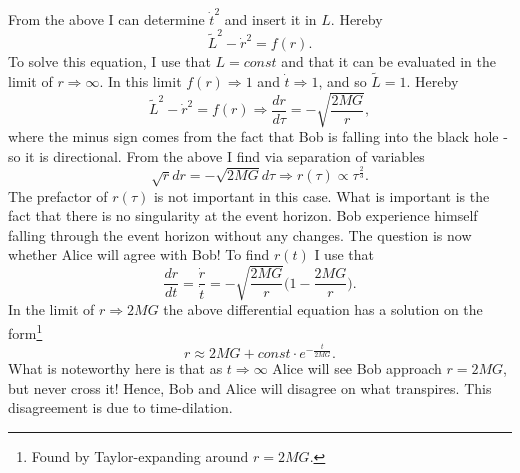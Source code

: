 \begin{example}
\begin{equation}
	\end{equation} 
	From the above I can determine $\dot{t}^2$ and insert it in $L$. Hereby
	\begin{equation}
		\tilde{L}^2-\dot{r}^2=f(r).
	\end{equation} 
	To solve this equation, I use that $L=const$ and that it can be evaluated in the limit of $r\Rightarrow\infty$. In this limit $f(r)\Rightarrow 1$ and $\dot{t}\Rightarrow1$, and so $\tilde{L}=1$. Hereby
	\begin{equation}
		\tilde{L}^2-\dot{r}^2=f(r)\Rightarrow \frac{dr}{d\tau}=-\sqrt{\frac{2MG}{r}},
	\end{equation} 
	where the minus sign comes from the fact that Bob is falling into the black hole - so it is directional. From the above I find via separation of variables
	\begin{equation}
		\sqrt{r}dr=-\sqrt{2MG}d\tau\Rightarrow r(\tau)\propto \tau^{\frac{2}{3}}.
	\end{equation} 
	The prefactor of $r(\tau)$ is not important in this case. What is important is the fact that there is no singularity at the event horizon. Bob experience himself falling through the event horizon without any changes. The question is now whether Alice will agree with Bob! To find $r(t)$ I use that
	\begin{equation}
		\frac{dr}{dt}=\frac{\dot{r}}{\dot{t}}=-\sqrt{\frac{2MG}{r}}\bigg(1-\frac{2MG}{r}\bigg).
	\end{equation} 
	In the limit of $r\Rightarrow 2MG$ the above differential equation has a solution on the form\footnote{Found by Taylor-expanding around $r=2MG$.}
	\begin{equation}
		r\approx 2MG+const\cdot e^{-\frac{t}{2MG}}.
	\end{equation} 
	What is noteworthy here is that as $t\Rightarrow \infty$ Alice will see Bob approach $r=2MG$, but never cross it! Hence, Bob and Alice will disagree on what transpires. This disagreement is due to time-dilation. 
\end{example}

